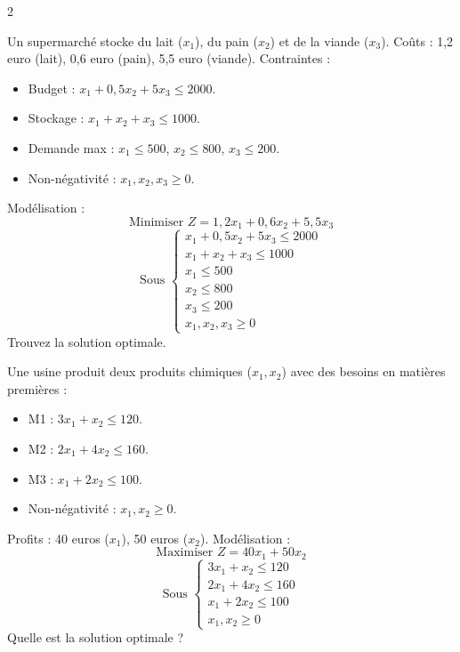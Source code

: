 \begin{multicols}{2}
\begin{exo}
	Un supermarché stocke du lait (\(x_1\)), du pain (\(x_2\)) et de la viande (\(x_3\)). Coûts : 1,2 euro (lait), 0,6 euro (pain), 5,5 euro (viande). Contraintes :
	\begin{itemize}
		\item Budget : \(x_1 + 0,5x_2 + 5x_3 \leq 2000\).
		\item Stockage : \(x_1 + x_2 + x_3 \leq 1000\).
		\item Demande max : \(x_1 \leq 500\), \(x_2 \leq 800\), \(x_3 \leq 200\).
		\item Non-négativité : \(x_1, x_2, x_3 \geq 0\).
	\end{itemize}
	Modélisation :
	\[
	\text{Minimiser } Z = 1,2x_1 + 0,6x_2 + 5,5x_3
	\]
	\[
	\text{Sous } \begin{cases}
	x_1 + 0,5x_2 + 5x_3 \leq 2000 \\
	x_1 + x_2 + x_3 \leq 1000 \\
	x_1 \leq 500 \\
	x_2 \leq 800 \\
	x_3 \leq 200 \\
	x_1, x_2, x_3 \geq 0
	\end{cases}
	\]
	Trouvez la solution optimale.
\end{exo}

\begin{exo}
	Une usine produit deux produits chimiques (\(x_1, x_2\)) avec des besoins en matières premières :
	\begin{itemize}
		\item M1 : \(3x_1 + x_2 \leq 120\).
		\item M2 : \(2x_1 + 4x_2 \leq 160\).
		\item M3 : \(x_1 + 2x_2 \leq 100\).
		\item Non-négativité : \(x_1, x_2 \geq 0\).
	\end{itemize}
	Profits : 40 euros (\(x_1\)), 50 euros (\(x_2\)).
	Modélisation :
	\[
	\text{Maximiser } Z = 40x_1 + 50x_2
	\]
	\[
	\text{Sous } \begin{cases}
	3x_1 + x_2 \leq 120 \\
	2x_1 + 4x_2 \leq 160 \\
	x_1 + 2x_2 \leq 100 \\
	x_1, x_2 \geq 0
	\end{cases}
	\]
	Quelle est la solution optimale ?
\end{exo}


\end{multicols}
